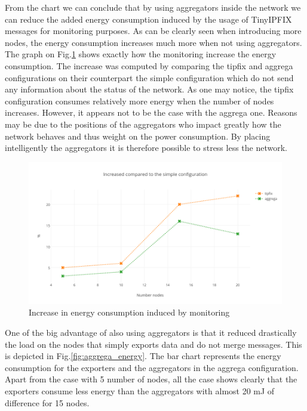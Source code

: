 From the chart we can conclude that by using aggregators inside the network we can reduce the added energy consumption induced by the usage of TinyIPFIX messages for monitoring purposes. As can be clearly seen when introducing more nodes, the energy consumption increases much more when not using aggregators. The graph on Fig.\ref{fig:increase_energy} shows exactly how the monitoring increase the energy consumption. The increase was computed by comparing the tipfix and aggrega configurations on their counterpart the simple configuration which do not send any information about the status of the network. As one may notice, the tipfix configuration consumes  relatively more energy when the number of nodes increases. However, it appears not to be the case with the aggrega one. Reasons may be due to the positions of the aggregators who impact greatly how the network behaves and thus weight on the power consumption. By placing intelligently the aggregators it is therefore possible to stress less the network.\\

\begin{figure}[h]
  \includegraphics[width=\textwidth]{res/increase_energy.png}
  \caption{Increase in energy consumption induced by monitoring}
  \label{fig:increase_energy}
\end{figure}

One of the big advantage of also using aggregators is that it reduced drastically the load on the nodes that simply exports data and do not merge messages. This is depicted in Fig.\ref{fig:aggrega_energy}. The bar chart represents the energy consumption for the exporters and the aggregators in the aggrega configuration. Apart from the case with 5 number of nodes, all the case shows clearly that the exporters consume less energy than the aggregators with almost 20 mJ of difference for 15 nodes.\\


